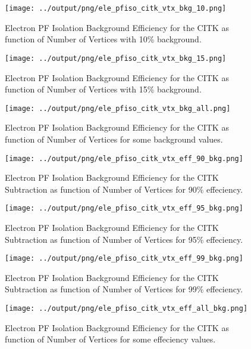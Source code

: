\documentclass[11pt]{book}
\begin{document}
\begin{figure}[htb]
\centering
\texttt{[image: ../output/png/ele\_pfiso\_citk\_vtx\_bkg\_10.png]}
\caption{Electron PF Isolation Background Efficiency for the CITK as function of Number of Vertices with 10\% background.}
\label{fig:ele_pfiso_vtx_bkg_citk_bkg_10}
\end{figure}

\begin{figure}[htb]
\centering
\texttt{[image: ../output/png/ele\_pfiso\_citk\_vtx\_bkg\_15.png]}
\caption{Electron PF Isolation Background Efficiency for the CITK as function of Number of Vertices with 15\% background.}
\label{fig:ele_pfiso_vtx_bkg_citk_bkg_15}
\end{figure}

\begin{figure}[htb]
\centering
\texttt{[image: ../output/png/ele\_pfiso\_citk\_vtx\_bkg\_all.png]}
\caption{Electron PF Isolation Background Efficiency for the CITK as function of Number of Vertices for some background values.}
\label{fig:ele_pfiso_vtx_bkg_citk_bkg_all}
\end{figure}

\begin{figure}[htb]
\centering
\texttt{[image: ../output/png/ele\_pfiso\_citk\_vtx\_eff\_90\_bkg.png]}
\caption{Electron PF Isolation Background Efficiency for the CITK Subtraction as function of Number of Vertices for 90\% effeciency.}
\label{fig:ele_pfiso_vtx_eff_citk_eff_90_bkg}
\end{figure}

\begin{figure}[htb]
\centering
\texttt{[image: ../output/png/ele\_pfiso\_citk\_vtx\_eff\_95\_bkg.png]}
\caption{Electron PF Isolation Background Efficiency for the CITK Subtraction as function of Number of Vertices for 95\% effeciency.}
\label{fig:ele_pfiso_vtx_eff_citk_eff_95_bkg}
\end{figure}

\begin{figure}[htb]
\centering
\texttt{[image: ../output/png/ele\_pfiso\_citk\_vtx\_eff\_99\_bkg.png]}
\caption{Electron PF Isolation Background Efficiency for the CITK Subtraction as function of Number of Vertices for 99\% effeciency.}
\label{fig:ele_pfiso_vtx_eff_citk_eff_99_bkg}
\end{figure}

\begin{figure}[htb]
\centering
\texttt{[image: ../output/png/ele\_pfiso\_citk\_vtx\_eff\_all\_bkg.png]}
\caption{Electron PF Isolation Background Efficiency for the CITK as function of Number of Vertices for some effeciency values.}
\label{fig:ele_pfiso_vtx_eff_citk_eff_all_bkg}
\end{figure}
\clearpage
\end{document}

